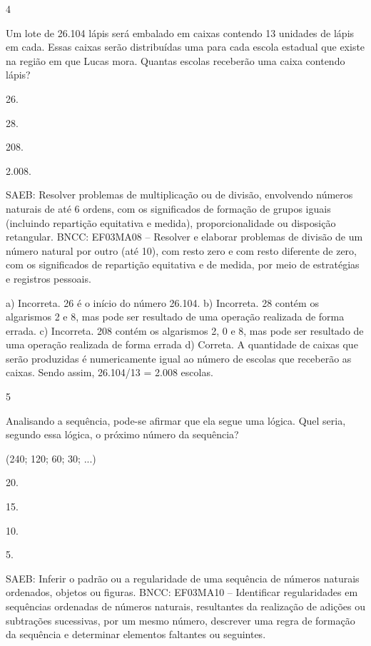 \begin{multicols}{2}
\begin{enumerate}
{\num{4}

Um lote de 26.104 lápis será embalado em caixas contendo 13 unidades de
lápis em cada. Essas caixas serão distribuídas uma para cada escola
estadual que existe na região em que Lucas mora. Quantas escolas
receberão uma caixa contendo lápis?

\begin{escolha}
\item
  26.
\item
  28.
\item
  208.
\item
  2.008.
\end{escolha}

SAEB: Resolver problemas de multiplicação ou de divisão, envolvendo números naturais de até 6 ordens, com os significados de formação de grupos iguais (incluindo repartição equitativa e medida), proporcionalidade ou disposição retangular.
BNCC: EF03MA08 -- Resolver e elaborar problemas de divisão de um número natural por outro (até
10), com resto zero e com resto diferente de zero, com os significados de repartição equitativa
e de medida, por meio de estratégias e registros pessoais.

a) Incorreta. 26 é o início do número 26.104.
b) Incorreta. 28 contém os algarismos 2 e 8, mas pode ser resultado de uma operação realizada de forma errada.
c) Incorreta. 208 contém os algarismos 2, 0 e 8, mas pode ser resultado de uma operação realizada de forma errada
d) Correta. A quantidade de caixas que serão produzidas é numericamente igual ao número de
escolas que receberão as caixas. Sendo assim, 26.104/13 = 2.008 escolas.

\num{5}

Analisando a sequência, pode-se afirmar que ela segue uma lógica. Quel seria, segundo essa lógica, o próximo número da sequência?

(240; 120; 60; 30; ...)

\begin{escolha}
\item
  20.
\item
  15.
\item
  10.
\item
  5.
\end{escolha}

SAEB: Inferir o padrão ou a regularidade de uma sequência de números naturais ordenados, objetos ou figuras.
BNCC: EF03MA10 -- Identificar regularidades em sequências ordenadas de números naturais,
resultantes da realização de adições ou subtrações sucessivas, por um mesmo número,
descrever uma regra de formação da sequência e determinar elementos faltantes ou seguintes.

}
\end{enumerate}
\end{multicols}
